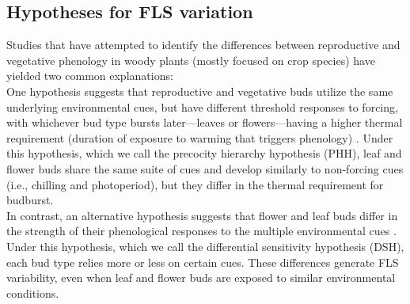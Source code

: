 \documentclass[11pt]{article}\usepackage[]{graphicx}\usepackage[]{color}
\begin{document}
\subsection*{Hypotheses for FLS variation}

\noindent Studies that have attempted to identify the differences between reproductive and vegetative phenology in woody plants (mostly focused on crop species) have yielded two common explanations:\\

\noindent One hypothesis suggests that reproductive and vegetative buds utilize the same underlying environmental cues, but have different threshold responses to forcing, with whichever bud type bursts later---leaves or flowers---having a higher thermal requirement (duration of exposure to warming that triggers phenology) \citep{Guo2014,COSMULESCU:2020aa,Cosmulescu:2018aa}. Under this hypothesis, which we call the precocity hierarchy hypothesis (PHH), leaf and flower buds share the same suite of cues and develop similarly to non-forcing cues (i.e., chilling and photoperiod), but they differ in the thermal requirement for budburst.\\

\noindent In contrast, an alternative hypothesis suggests that flower and leaf buds differ in the strength of their phenological responses to the multiple environmental cues \citep{Citadin2001,Gariglio2006,Aslani2009,Mehlenbacher:1991aa}. Under this hypothesis, which we call the differential sensitivity hypothesis (DSH), each bud type relies more or less on certain cues. These differences generate FLS variability, even when leaf and flower buds are exposed to similar environmental conditions.\\ %
\end{document}
